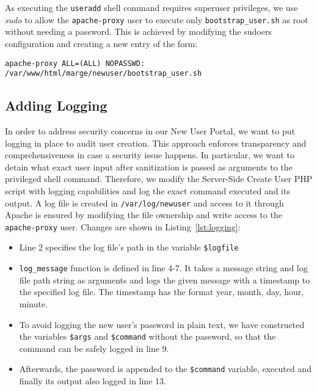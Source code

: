 As executing the \texttt{useradd} shell command requires superuser privileges,
we use \textit{sudo} to allow the \texttt{apache-proxy} user to execute only
\texttt{bootstrap\_user.sh} as root without needing a password. This is achieved
by modifying the sudoers configuration and creating a new entry of the form:

\begin{lstlisting}[frame=single]
    apache-proxy ALL=(ALL) NOPASSWD: /var/www/html/marge/newuser/bootstrap_user.sh
\end{lstlisting}


\subsection{Adding Logging}\label{section:logging}

In order to address security concerns in our New User Portal, we want to put
logging in place to audit user creation. This approach enforces transparency and
comprehensiveness in case a security issue happens. In particular, we want to
detain what exact user input after sanitization is passed as arguments to the
privileged shell command. Therefore, we modify the Server-Side Create User PHP
script with logging capabilities and log the exact command executed and its
output. A log file is created in \texttt{/var/log/newuser} and access to it
through Apache is ensured by modifying the file ownership and write access to
the \texttt{apache-proxy} user. Changes are shown in Listing~\ref{lst:logging}:

\begin{itemize}
    \item Line 2 specifies the log file's path in the variable
    \texttt{\$logfile}
    \item \texttt{log\_message} function is defined in line 4-7. It takes a
    message string and log file path string as arguments and logs the given
    message with a timestamp to the specified log file. The timestamp has the
    format year, month, day, hour, minute.
    \item To avoid logging the new user's password in plain text, we have
    constructed the variables \texttt{\$args} and \texttt{\$command} without the
    password, so that the command can be safely logged in line 9.
    \item Afterwards, the password is appended to the \texttt{\$command}
    variable, executed and finally its output also logged in line 13.
\end{itemize}

